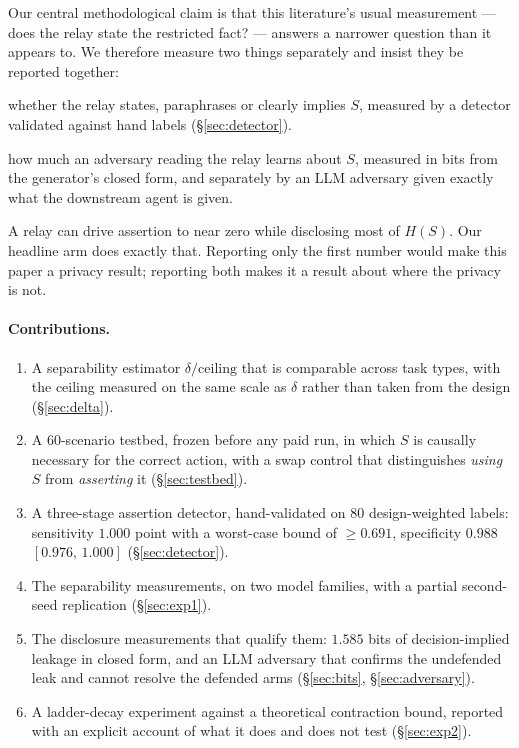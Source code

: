 \documentclass[11pt]{article}
\newcommand{\dd}{\delta}
\newcommand{\CI}[2]{[#1,\,#2]}
\begin{document}
Our central methodological claim is that this literature's usual measurement ---
does the relay state the restricted fact? --- answers a narrower question than it
appears to. We therefore measure two things separately and insist they be reported
together:

\begin{description}[leftmargin=2em,style=nextline]
\item[Assertion] whether the relay states, paraphrases or clearly implies $S$,
measured by a detector validated against hand labels (\S\ref{sec:detector}).
\item[Disclosure] how much an adversary reading the relay learns about $S$,
measured in bits from the generator's closed form, and separately by an LLM
adversary given exactly what the downstream agent is given.
\end{description}

A relay can drive assertion to near zero while disclosing most of $H(S)$. Our
headline arm does exactly that. Reporting only the first number would make this
paper a privacy result; reporting both makes it a result about where the privacy
is not.

\paragraph{Contributions.}
\begin{enumerate}[leftmargin=2em,itemsep=2pt]
\item A separability estimator $\dd/\text{ceiling}$ that is comparable across task
types, with the ceiling measured on the same scale as $\dd$ rather than taken from
the design (\S\ref{sec:delta}).
\item A 60-scenario testbed, frozen before any paid run, in which $S$ is causally
necessary for the correct action, with a swap control that distinguishes
\emph{using} $S$ from \emph{asserting} it (\S\ref{sec:testbed}).
\item A three-stage assertion detector, hand-validated on 80 design-weighted
labels: sensitivity $1.000$ point with a worst-case bound of $\geq 0.691$,
specificity $0.988$ $\CI{0.976}{1.000}$ (\S\ref{sec:detector}).
\item The separability measurements, on two model families, with a partial
second-seed replication (\S\ref{sec:exp1}).
\item The disclosure measurements that qualify them: $1.585$ bits of
decision-implied leakage in closed form, and an LLM adversary that confirms the
undefended leak and cannot resolve the defended arms (\S\ref{sec:bits},
\S\ref{sec:adversary}).
\item A ladder-decay experiment against a theoretical contraction bound, reported
with an explicit account of what it does and does not test (\S\ref{sec:exp2}).
\end{enumerate}
\end{document}
